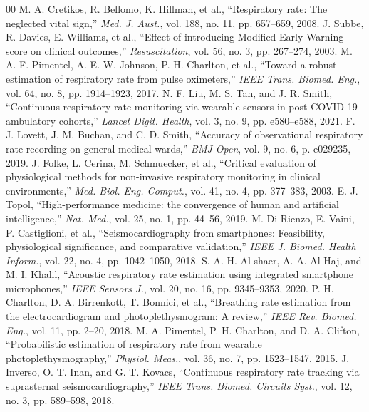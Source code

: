 \documentclass[journal]{IEEEtran}
\begin{document}
\begin{thebibliography}{00}
 M. A. Cretikos, R. Bellomo, K. Hillman, et al., ``Respiratory rate: The neglected vital sign,'' \textit{Med. J. Aust.}, vol. 188, no. 11, pp. 657--659, 2008.
 J. Subbe, R. Davies, E. Williams, et al., ``Effect of introducing Modified Early Warning score on clinical outcomes,'' \textit{Resuscitation}, vol. 56, no. 3, pp. 267--274, 2003.
 M. A. F. Pimentel, A. E. W. Johnson, P. H. Charlton, et al., ``Toward a robust estimation of respiratory rate from pulse oximeters,'' \textit{IEEE Trans. Biomed. Eng.}, vol. 64, no. 8, pp. 1914--1923, 2017.
 N. F. Liu, M. S. Tan, and J. R. Smith, ``Continuous respiratory rate monitoring via wearable sensors in post-COVID-19 ambulatory cohorts,'' \textit{Lancet Digit. Health}, vol. 3, no. 9, pp. e580--e588, 2021.
 F. J. Lovett, J. M. Buchan, and C. D. Smith, ``Accuracy of observational respiratory rate recording on general medical wards,'' \textit{BMJ Open}, vol. 9, no. 6, p. e029235, 2019.
 J. Folke, L. Cerina, M. Schmuecker, et al., ``Critical evaluation of physiological methods for non-invasive respiratory monitoring in clinical environments,'' \textit{Med. Biol. Eng. Comput.}, vol. 41, no. 4, pp. 377--383, 2003.
 E. J. Topol, ``High-performance medicine: the convergence of human and artificial intelligence,'' \textit{Nat. Med.}, vol. 25, no. 1, pp. 44--56, 2019.
 M. Di Rienzo, E. Vaini, P. Castiglioni, et al., ``Seismocardiography from smartphones: Feasibility, physiological significance, and comparative validation,'' \textit{IEEE J. Biomed. Health Inform.}, vol. 22, no. 4, pp. 1042--1050, 2018.
 S. A. H. Al-shaer, A. A. Al-Haj, and M. I. Khalil, ``Acoustic respiratory rate estimation using integrated smartphone microphones,'' \textit{IEEE Sensors J.}, vol. 20, no. 16, pp. 9345--9353, 2020.
 P. H. Charlton, D. A. Birrenkott, T. Bonnici, et al., ``Breathing rate estimation from the electrocardiogram and photoplethysmogram: A review,'' \textit{IEEE Rev. Biomed. Eng.}, vol. 11, pp. 2--20, 2018.
 M. A. Pimentel, P. H. Charlton, and D. A. Clifton, ``Probabilistic estimation of respiratory rate from wearable photoplethysmography,'' \textit{Physiol. Meas.}, vol. 36, no. 7, pp. 1523--1547, 2015.
 J. Inverso, O. T. Inan, and G. T. Kovacs, ``Continuous respiratory rate tracking via suprasternal seismocardiography,'' \textit{IEEE Trans. Biomed. Circuits Syst.}, vol. 12, no. 3, pp. 589--598, 2018.

\end{thebibliography}
\end{document}
